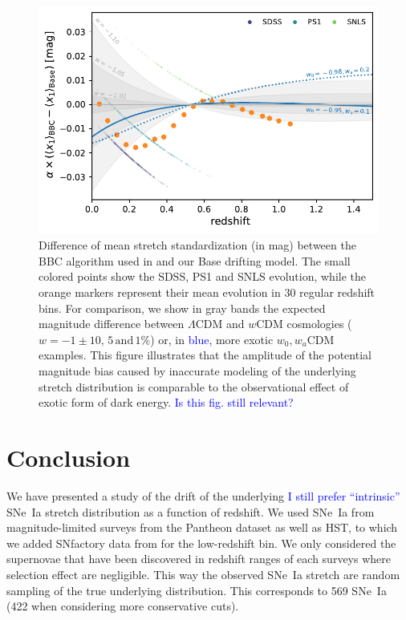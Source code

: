 \documentclass[]{aa} %
\newcommand{\nn}[1]{{\textcolor[rgb]{1, 0.27, 0}{#1}}}
\newcommand{\yc}[1]{{\textcolor{blue}{#1}}}
\begin{document}
\begin{figure}
    \centering
    \includegraphics[width=\linewidth]{Article_figures/BBC_distmod_w0wa.pdf}
    \caption{Difference of mean stretch standardization (in mag) between the BBC
        algorithm used in \cite{scolnic2018a} and our Base drifting model.
        \nn{The small colored points show the SDSS, PS1 and SNLS evolution,
            while the orange markers represent their mean evolution in 30
            regular redshift bins.} For comparison, we show in gray bands the
            expected magnitude difference between $\Lambda$CDM and $w$CDM
            cosmologies ($w=-1\pm 10,\,5\,\mathrm{and}\,1\%$) or, in \yc{blue},
            more exotic $w_0,w_a$CDM examples. This figure illustrates that the
            amplitude of the potential magnitude bias caused by inaccurate
        modeling of the underlying stretch distribution is comparable to the
    observational effect of exotic form of dark energy. \yc{Is this fig. still relevant?}}
    \label{fig:magdrift}
\end{figure}

\section{Conclusion}
\label{sec:ccl}

We have presented a study of the drift of the underlying \yc{I still prefer ``intrinsic''} SNe~Ia stretch
distribution as a function of redshift. We used SNe~Ia from magnitude-limited
surveys from the Pantheon dataset \citep[][SDSS, PS1 and SNLS]{scolnic2018a} as
well as HST, to which we added SNfactory data from \cite{rigault2018} for the
low-redshift bin. We only considered the supernovae that have been discovered
in redshift ranges of each surveys where selection effect are negligible. This
way the observed SNe~Ia stretch are random sampling of the true underlying
distribution. This corresponds to 569 SNe~Ia (422 when considering more
conservative cuts).
\end{document}
